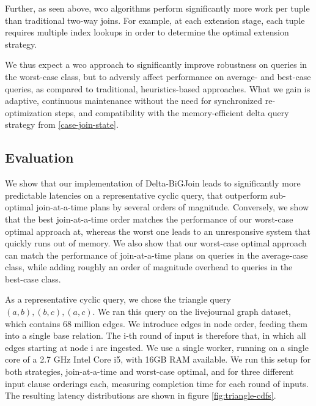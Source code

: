 \documentclass[../catalog.tex]{subfiles}
\begin{document}
Further, as seen above, wco algorithms perform significantly more work
per tuple than traditional two-way joins. For example, at each
extension stage, each tuple requires multiple index lookups in order
to determine the optimal extension strategy.

We thus expect a wco approach to significantly improve robustness on
queries in the worst-case class, but to adversly affect performance on
average- and best-case queries, as compared to traditional,
heuristics-based approaches. What we gain is adaptive, continuous
maintenance without the need for synchronized re-optimization steps,
and compatibility with the memory-efficient delta query strategy from
\autoref{case-join-state}.

\subsection{Evaluation}

We show that our implementation of Delta-BiGJoin leads to
significantly more predictable latencies on a representative cyclic
query, that outperform sub-optimal join-at-a-time plans by several
orders of magnitude. Conversely, we show that the best join-at-a-time
order matches the performance of our worst-case optimal approach at,
whereas the worst one leads to an unresponsive system that quickly
runs out of memory. We also show that our worst-case optimal approach
can match the performance of join-at-a-time plans on queries in the
average-case class, while adding roughly an order of magnitude
overhead to queries in the best-case class.

As a representative cyclic query, we chose the triangle query $(a,b),
(b,c), (a,c)$. We ran this query on the livejournal graph dataset,
which contains 68 million edges. We introduce edges in node order,
feeding them into a single base relation. The i-th round of input is
therefore that, in which all edges starting at node i are ingested. We
use a single worker, running on a single core of a 2.7 GHz Intel Core
i5, with 16GB RAM available. We run this setup for both strategies,
join-at-a-time and worst-case optimal, and for three different input
clause orderings each, measuring completion time for each round of
inputs. The resulting latency distributions are shown in figure
\ref{fig:triangle-cdfs}.
\end{document}

